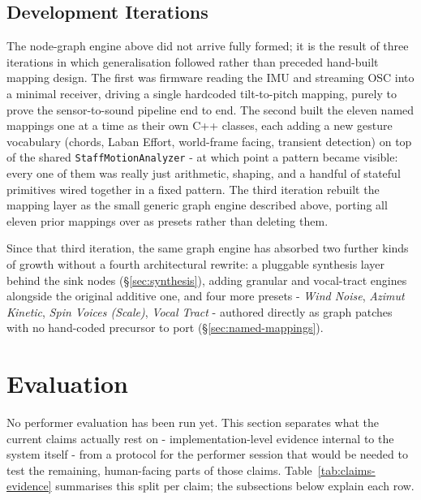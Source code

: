 \documentclass[sigconf,nonacm]{acmart}
\newcommand{\preset}[1]{\textit{#1}}
\begin{document}
\subsection{Development Iterations}
The node-graph engine above did not arrive fully formed; it is the result of three iterations in
which generalisation followed rather than preceded hand-built mapping design. The first was
firmware reading the IMU and streaming OSC into a minimal receiver, driving a single hardcoded
tilt-to-pitch mapping, purely to prove the sensor-to-sound pipeline end to end. The second built
the eleven named mappings one at a time as their own C++ classes, each adding a new gesture
vocabulary (chords, Laban Effort, world-frame facing, transient detection) on top of the shared
\texttt{StaffMotionAnalyzer} - at which point a pattern became visible: every one of them was
really just arithmetic, shaping, and a handful of stateful primitives wired together in a fixed
pattern. The third iteration rebuilt the mapping layer as the small generic graph engine described
above, porting all eleven prior mappings over as presets rather than deleting them.

Since that third iteration, the same graph engine has absorbed two further kinds of growth without a
fourth architectural rewrite: a pluggable synthesis layer behind the sink nodes
(\S\ref{sec:synthesis}), adding granular and vocal-tract engines alongside the original additive
one, and four more presets - \preset{Wind Noise}, \preset{Azimut Kinetic}, \preset{Spin Voices
(Scale)}, \preset{Vocal Tract} - authored directly as graph patches with no hand-coded precursor to
port (\S\ref{sec:named-mappings}).

\section{Evaluation}
\label{sec:evaluation}
No performer evaluation has been run yet. This section separates what the current claims actually
rest on - implementation-level evidence internal to the system itself - from a protocol for the
performer session that would be needed to test the remaining, human-facing parts of those claims.
Table~\ref{tab:claims-evidence} summarises this split per claim; the subsections below explain each row.
\end{document}
